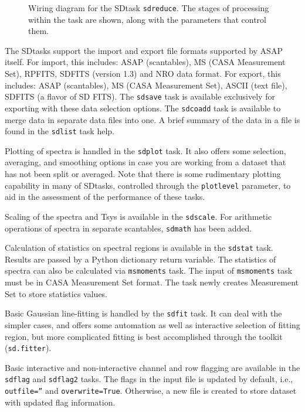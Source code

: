\begin{figure}[h!]
\begin{center}
\caption{\label{fig:sdreduce} Wiring diagram for the SDtask {\tt sdreduce}.
The stages of processing within the task are shown, along with the
parameters that control them. }
\hrulefill
\end{center}
\end{figure}

The SDtasks support the import and export file formats supported
by ASAP itself.  For import, this includes:  ASAP (scantables), 
MS (CASA Measurement Set), RPFITS, SDFITS (version 1.3) and NRO data format.  
For export, this includes: ASAP (scantables), MS (CASA Measurement Set),
ASCII (text file), SDFITS (a flavor of SD FITS).
The {\tt sdsave} task is available exclusively for exporting with these
data selection options.  The {\tt sdcoadd} task is available to merge data in separate data files
into one.  A brief summary of the data in a file is found in the {\tt sdlist}
task help.

Plotting of spectra is handled in the {\tt sdplot} task.  It also offers
some selection, averaging, and smoothing options in case you are
working from a dataset that has not been split or averaged.  Note that
there is some rudimentary plotting capability in many of SDtasks, 
controlled through the {\tt plotlevel} parameter, 
to aid in the assessment of the performance of these tasks.

Scaling of the spectra and Tsys is available in the {\tt sdscale}.
For arithmetic operations of spectra in separate scantables, {\tt sdmath}
has been added. 

Calculation of statistics on spectral regions is available in the {\tt sdstat} task.
Results are passed by a Python dictionary return variable.
The statistics of spectra can also be calculated via {\tt msmoments} task.
The input of {\tt msmoments} task must be in CASA Measurement Set format.
The task newly creates Measurement Set to store statistics values.

Basic Gaussian line-fitting is handled by the {\tt sdfit} task.  It can deal
with the simpler cases, and offers some automation as well as interactive 
selection of fitting region, but more complicated
fitting is best accomplished through the toolkit ({\tt sd.fitter}).

Basic interactive and non-interactive channel and row flagging are available 
in the {\tt sdflag}  and {\tt sdflag2} tasks. 
The flags in the input file is updated by default, i.e., {\tt outfile=''} 
and {\tt overwrite=True}. Otherwise, a new file is created to store dataset
with updated flag information.

